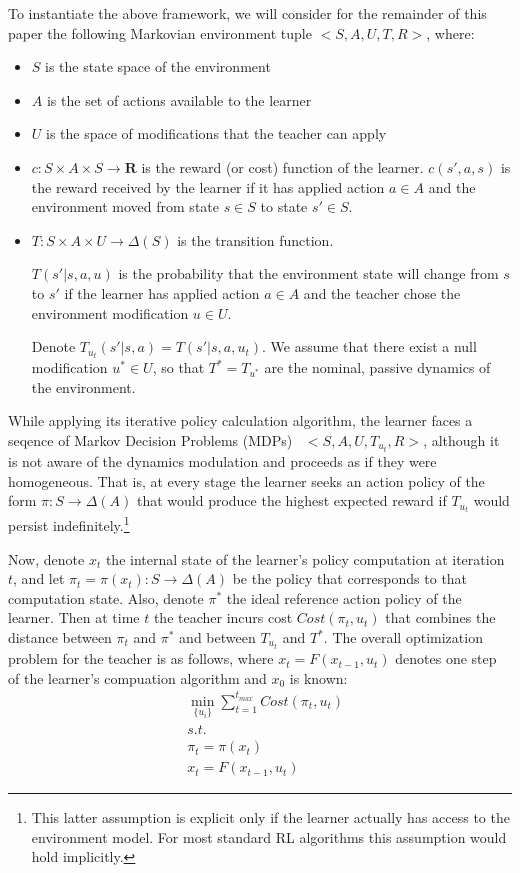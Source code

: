 \documentclass[letterpaper]{aamas2009}
\begin{document}
To instantiate the above framework, we will consider for the remainder
of this paper the following Markovian environment tuple $<S,A,U,T,R>$,
where:
\begin{itemize}
\item $S$ is the state space of the environment
\item $A$ is the set of actions available to the learner
\item $U$ is the space of modifications that the teacher can apply
\item $c:S\times A\times S\rightarrow\mathbf{R}$ is the reward (or
  cost) function of the learner. $c(s',a,s)$ is the reward received by
  the learner if it has applied action $a\in A$ and the environment
  moved from state $s\in S$ to state $s'\in S$.
\item $T:S\times A\times U\rightarrow\Delta(S)$ is the transition
  function. 

$T(s'|s,a,u)$ is the probability that the
  environment state will change from $s$ to $s'$ if the learner has
  applied action $a\in A$ and the teacher chose the environment
  modification $u\in U$.

Denote $T_{u_t}(s'|s,a)=T(s'|s,a,u_t)$. We assume that there exist a null
  modification $u^*\in U$, so that $T^*=T_{u^*}$ are the nominal,
  passive dynamics of the environment.
\end{itemize}

While applying its iterative policy calculation algorithm, the learner
faces a seqence of Markov Decision Problems (MDPs)~\cite{puterman_book_94}
$<S,A,U,T_{u_t},R>$, although it is not aware of the dynamics
modulation and proceeds as if they were homogeneous. That is, at every
stage the learner seeks an action policy of the form
$\pi:S\rightarrow\Delta(A)$ that would produce the highest expected
reward if $T_{u_t}$ would persist indefinitely.\footnote{This latter
  assumption is explicit only if the learner actually has access to
  the environment model. For most standard RL algorithms this
  assumption would hold implicitly.}

Now, denote $x_t$ the internal state of the learner's policy
computation at iteration $t$, and let
$\pi_t=\pi(x_t):S\rightarrow\Delta(A)$ be the policy that corresponds
to that computation state. Also, denote $\pi^*$ the ideal reference
action policy of the learner. Then at time $t$ the teacher incurs cost
$Cost(\pi_t,u_t)$ that combines the distance between $\pi_t$ and
$\pi^*$ and between $T_{u_t}$ and $T^*$. The overall optimization
problem for the teacher is as follows, where $x_t=F(x_{t-1},u_t)$
denotes one step of the learner's compuation algorithm and $x_0$ is
known:
\begin{eqnarray*}
&\min\limits_{\{u_i\}}\sum\limits_{t=1}^{t_{max}}Cost(\pi_t,u_t)\\
&s.t.\\
&\pi_t=\pi(x_t)\\
&x_t=F(x_{t-1},u_t)
\end{eqnarray*}
\end{document}
